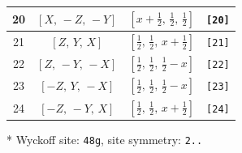 \documentclass[fleqn,8pt]{jsarticle}
\begin{document}
\begin{longtable}{cccc}
20 & $\left[ X,\, - Z,\, - Y \right]$ & $\left[ x + \frac{1}{2},\, \frac{1}{2},\, \frac{1}{2} \right]$ & {\tt [20]} \\ \hline
21 & $\left[ Z,\, Y,\, X \right]$ & $\left[ \frac{1}{2},\, \frac{1}{2},\, x + \frac{1}{2} \right]$ & {\tt [21]} \\ \hline
22 & $\left[ Z,\, - Y,\, - X \right]$ & $\left[ \frac{1}{2},\, \frac{1}{2},\, \frac{1}{2} - x \right]$ & {\tt [22]} \\ \hline
23 & $\left[ - Z,\, Y,\, - X \right]$ & $\left[ \frac{1}{2},\, \frac{1}{2},\, \frac{1}{2} - x \right]$ & {\tt [23]} \\ \hline
24 & $\left[ - Z,\, - Y,\, X \right]$ & $\left[ \frac{1}{2},\, \frac{1}{2},\, x + \frac{1}{2} \right]$ & {\tt [24]} \\
\end{longtable}
* Wyckoff site: {\tt 48g}, site symmetry: {\tt 2..}
\renewcommand{\arraystretch}{1.2}
\end{document}
